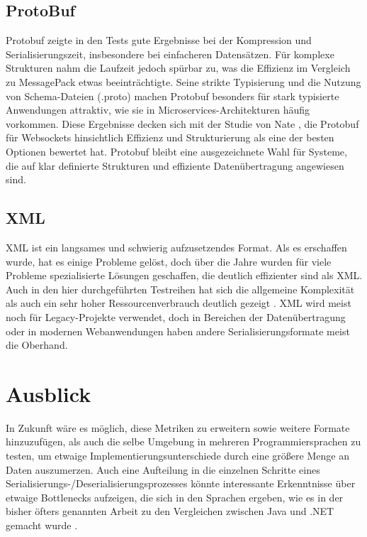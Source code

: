 \documentclass[ngerman]{seminarvorlage}
\begin{document}
\subsection{ProtoBuf}
Protobuf zeigte in den Tests gute Ergebnisse bei der Kompression und Serialisierungszeit, insbesondere bei einfacheren Datensätzen. Für komplexe Strukturen nahm die Laufzeit jedoch spürbar zu, was die Effizienz im Vergleich zu MessagePack etwas beeinträchtigte. Seine strikte Typisierung und die Nutzung von Schema-Dateien (.proto) machen Protobuf besonders für stark typisierte Anwendungen attraktiv, wie sie in Microservices-Architekturen häufig vorkommen. Diese Ergebnisse decken sich mit der Studie von Nate \cite{Nate10_2024}, die Protobuf für Websockets hinsichtlich Effizienz und Strukturierung als eine der besten Optionen bewertet hat. Protobuf bleibt eine ausgezeichnete Wahl für Systeme, die auf klar definierte Strukturen und effiziente Datenübertragung angewiesen sind.

\subsection{XML}
XML ist ein langsames und schwierig aufzusetzendes Format. Als es erschaffen wurde, hat es einige Probleme gelöst, doch über die Jahre wurden für viele Probleme spezialisierte Lösungen geschaffen, die deutlich effizienter sind als XML. Auch in den hier durchgeführten Testreihen hat sich die allgemeine Komplexität als auch ein sehr hoher Ressourcenverbrauch deutlich gezeigt \cite{Pommerenig_2019}. XML wird meist noch für Legacy-Projekte verwendet, doch in Bereichen der Datenübertragung oder in modernen Webanwendungen haben andere Serialisierungsformate meist die Oberhand.


\section{Ausblick}

In Zukunft wäre es möglich, diese Metriken zu erweitern sowie weitere Formate hinzuzufügen, als auch die selbe Umgebung in mehreren Programmiersprachen zu testen, um etwaige Implementierungsunterschiede durch eine größere Menge an Daten auszumerzen. Auch eine Aufteilung in die einzelnen Schritte eines Serialisierungs-/Deserialisierungsprozesses könnte interessante Erkenntnisse über etwaige Bottlenecks aufzeigen, die sich in den Sprachen ergeben, wie es in der bisher öfters genannten Arbeit zu den Vergleichen zwischen Java und .NET gemacht wurde \cite{10.1145/944579.944589}. 
\end{document}
